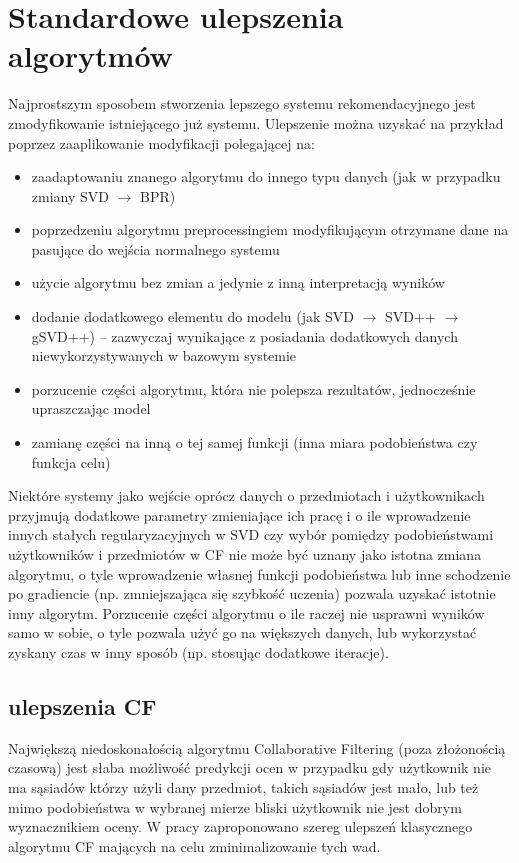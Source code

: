 \documentclass{pracamgr}
\begin{document}
  \section{Standardowe ulepszenia algorytmów}
   Najprostszym sposobem stworzenia lepszego systemu rekomendacyjnego jest zmodyfikowanie istniejącego już systemu.\newline
   Ulepszenie można uzyskać na przykład poprzez zaaplikowanie modyfikacji polegającej na:
   \begin{itemize}\itemsep1pt \parskip0pt 
    \item zaadaptowaniu znanego algorytmu do innego typu danych (jak w przypadku zmiany SVD $\rightarrow$ BPR)
    \item poprzedzeniu algorytmu preprocessingiem modyfikującym otrzymane dane na pasujące do wejścia normalnego systemu
    \item użycie algorytmu bez zmian a jedynie z inną interpretacją wyników
    \item dodanie dodatkowego elementu do modelu (jak SVD $\rightarrow$ SVD++ $\rightarrow$ gSVD++)
          -- zazwyczaj wynikające z posiadania dodatkowych danych niewykorzystywanych w bazowym systemie
    \item porzucenie części algorytmu, która nie polepsza rezultatów, jednocześnie upraszczając model
    \item zamianę części na inną o tej samej funkcji (inna miara podobieństwa czy funkcja celu)
   \end{itemize}
   Niektóre systemy jako wejście oprócz danych o przedmiotach i użytkownikach przyjmują dodatkowe parametry zmieniające ich pracę i o ile
   wprowadzenie innych stałych regularyzacyjnych w SVD czy wybór pomiędzy podobieństwami użytkowników i przedmiotów w CF nie może być uznany jako
   istotna zmiana algorytmu, o tyle wprowadzenie własnej funkcji podobieństwa lub inne schodzenie po gradiencie (np. zmniejszająca się szybkość uczenia)
   pozwala uzyskać istotnie inny algorytm.\newline\newline
   Porzucenie części algorytmu o ile raczej nie usprawni wyników samo w sobie, o tyle pozwala użyć go na większych danych,
   lub wykorzystać zyskany czas w inny sposób (np. stosując dodatkowe iteracje).
   \subsection{ulepszenia CF}
    Największą niedoskonałością algorytmu Collaborative Filtering (poza złożonością czasową) jest słaba możliwość predykcji ocen w przypadku gdy użytkownik nie
    ma sąsiadów którzy użyli dany przedmiot, takich sąsiadów jest mało,
    lub też mimo podobieństwa w wybranej mierze bliski użytkownik nie jest dobrym wyznacznikiem oceny.\newline
    W pracy \cite{221} zaproponowano szereg ulepszeń klasycznego algorytmu CF mających na celu zminimalizowanie tych wad.
\end{document}
